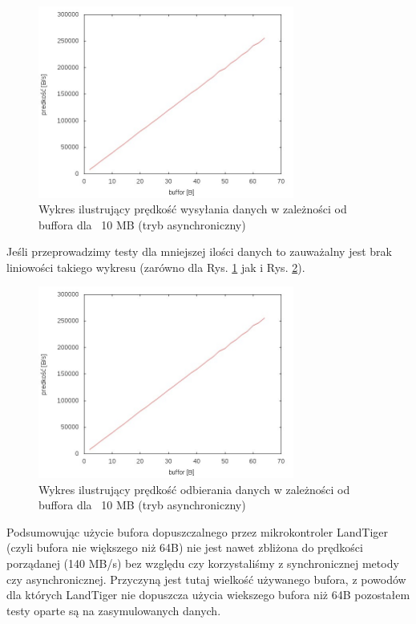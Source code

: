 \documentclass{BscUS}
\begin{document}

\begin{figure}[H]
{
\centering
\includegraphics[width=0.75\textwidth]{./img/A_10737420Send}
\caption{Wykres ilustrujący prędkość wysyłania danych w zależności od buffora dla ~10 MB (tryb asynchroniczny)}
\label{fig:A_10737420Send}
}
\end{figure}

\noindent Jeśli przeprowadzimy testy dla mniejszej ilości danych to zauważalny jest brak liniowości takiego wykresu (zarówno dla Rys. \ref{fig:A_10737420Send} jak i Rys. \ref{fig:A_10737420Receive}).
\begin{figure}[H]
{
\centering
\includegraphics[width=0.75\textwidth]{./img/A_10737420Receive}
\caption{Wykres ilustrujący prędkość odbierania danych w zależności od buffora dla ~10 MB (tryb asynchroniczny)}
\label{fig:A_10737420Receive}
}
\end{figure}

\indent Podsumowując użycie bufora dopuszczalnego przez mikrokontroler LandTiger (czyli bufora nie większego niż 64B) nie jest nawet zbliżona do prędkości porządanej (140 MB/s) bez względu czy korzystaliśmy z synchronicznej metody czy asynchronicznej. Przyczyną jest tutaj wielkość używanego bufora, z powodów dla których LandTiger nie dopuszcza użycia wiekszego bufora niż 64B  pozostałem testy oparte są na zasymulowanych danych. 
\newline
\end{document}
